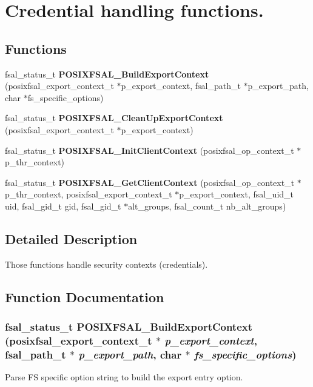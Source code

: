 \section{Credential handling functions.}
\label{group__FSALCredFunctions}
\subsection*{Functions}
\begin{DoxyCompactItemize}
\item 
fsal\_\-status\_\-t {\bf POSIXFSAL\_\-BuildExportContext} (posixfsal\_\-export\_\-context\_\-t $\ast$p\_\-export\_\-context, fsal\_\-path\_\-t $\ast$p\_\-export\_\-path, char $\ast$fs\_\-specific\_\-options)
\item 
fsal\_\-status\_\-t {\bf POSIXFSAL\_\-CleanUpExportContext} (posixfsal\_\-export\_\-context\_\-t $\ast$p\_\-export\_\-context)
\item 
fsal\_\-status\_\-t {\bfseries POSIXFSAL\_\-InitClientContext} (posixfsal\_\-op\_\-context\_\-t $\ast$p\_\-thr\_\-context)\label{group__FSALCredFunctions_ga989d345cd73e0d77ad40a4504f14f543}

\item 
fsal\_\-status\_\-t {\bf POSIXFSAL\_\-GetClientContext} (posixfsal\_\-op\_\-context\_\-t $\ast$p\_\-thr\_\-context, posixfsal\_\-export\_\-context\_\-t $\ast$p\_\-export\_\-context, fsal\_\-uid\_\-t uid, fsal\_\-gid\_\-t gid, fsal\_\-gid\_\-t $\ast$alt\_\-groups, fsal\_\-count\_\-t nb\_\-alt\_\-groups)
\end{DoxyCompactItemize}


\subsection{Detailed Description}
Those functions handle security contexts (credentials). 

\subsection{Function Documentation}
\subsubsection[{POSIXFSAL\_\-BuildExportContext}]{\setlength{\rightskip}{0pt plus 5cm}fsal\_\-status\_\-t POSIXFSAL\_\-BuildExportContext (posixfsal\_\-export\_\-context\_\-t $\ast$ {\em p\_\-export\_\-context}, \/  fsal\_\-path\_\-t $\ast$ {\em p\_\-export\_\-path}, \/  char $\ast$ {\em fs\_\-specific\_\-options})}\label{group__FSALCredFunctions_ga2e17a6da39a1d58a20bf195e50260b89}
Parse FS specific option string to build the export entry option. 

